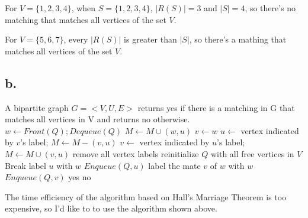 \documentclass{article}
\begin{document}
For $V=\{1,2,3,4\}$, when $S=\{1,2,3,4\}$, $|R(S)| = 3$ and $ |S| = 4$, so there's no matching that matches all vertices of the set $V$.

For $V= \{5,6,7\}$, every $|R(S)|$ is greater than $|S|$, so there's a mathing that matches all vertices of the set $V$.

\subsection*{b.}

\begin{center}
\begin{algorithmic}
\INPUT
A bipartite graph $G = <V,U,E>$
\OUTPUT
returns yes if there is a matching in  G that matches all vertices in V and returns no otherwise.
\State $w \leftarrow Front(Q); Dequeue(Q)$
\State $M \leftarrow M \cup (w,u)$
\State $v \leftarrow w$
\State $u \leftarrow$ vertex indicated by $v$'s label; $M \leftarrow M - (v,u)$
\State $v \leftarrow$ vertex indicated by $u$'s label; $M \leftarrow M \cup (v,u)$
\EndWhile
\State remove all vertex labels
\State reinitialize $Q$ with all free vertices in $V$
\State Break 
\Else
{}
\State label $u$ with $w$
\State $Enqueue(Q,u)$
\EndIf
\EndIf
\EndFor
\Else
\State label the mate $v$ of $w$ with $w$
\State $Enqueue(Q,v)$
\EndIf
\EndWhile
{}
\State \Return yes
\Else
\State \Return no
\EndIf
\EndFunction
\end{algorithmic}
\end{center}

The time efficiency of the algorithm based on Hall's Marriage Theorem is too expensive, so I'd like to to use the algorithm shown above.
\end{document}
